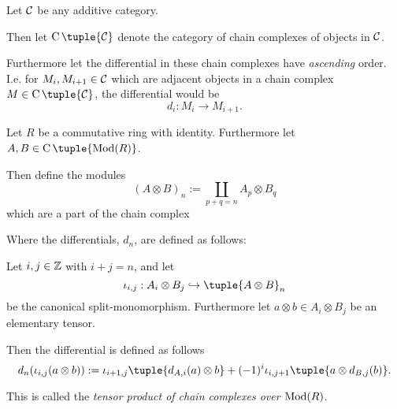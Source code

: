 \begin{notation}
    Let \( {\mathcal{C}} \) be any additive category.
    
    Then let \( \C \tuple{\Cc} \) denote the category of chain complexes of objects in \( {\mathcal{C}} \).

    Furthermore let the differential in these chain complexes have \emph{ascending} order. I.e. for \( M_i, M_{i+1} \in {\mathcal{C}} \) which are adjacent objects in a chain complex \( M \in \C \tuple{\Cc} \), the differential would be
    \[
        d_i : M_i \to M_{i + 1}.
    \]
\end{notation}

\begin{definition}
    \label{def:massey_product_in_dg_cat/what_is_a_dg_cat/tensor_product_of_chain_complexes}
    Let \( R \) be a commutative ring with identity. Furthermore let \( A, B \in \C \tuple{\Mod(R)} \).

    Then define the modules
    \[
        (A \otimes B)_n := \coprod_{p + q = n} A_p \otimes B_q
    \]
    which are a part of the chain complex
    \begin{center}
    \end{center}

    Where the differentials, \( d_n \), are defined as follows:
    
    Let \( i, j \in {\mathbb{Z}} \) with \( i + j = n \), and let
    \[
        \iota_{i, j}: A_i \otimes B_j \hookrightarrow \tuple{A \otimes B}_n
    \]
    be the canonical split-monomorphism. Furthermore let \( a \otimes b \in A_i \otimes B_j \) be an elementary tensor.

    Then the differential is defined as follows
    \[
        d_n(\iota_{i, j}(a \otimes b)) := \iota_{i + 1, j}\tuple{d_{A, i}(a) \otimes b} + (-1)^{i} \iota_{i, j + 1}\tuple{a \otimes d_{B, j}(b)}.
    \]

    This is called the \emph{tensor product of chain complexes over \( \operatorname{Mod}(R) \)}.
\end{definition}

